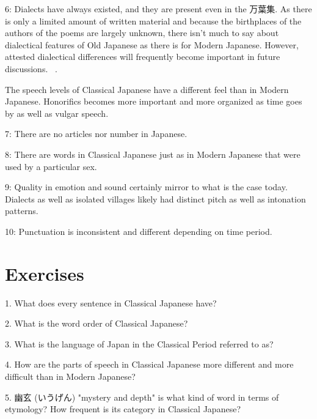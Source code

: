 \par{6: Dialects have always existed, and they are present even in the 万葉集. As there is only a limited amount of written material and because the birthplaces of the authors of the poems are largely unknown, there isn't much to say about dialectical features of Old Japanese as there is for Modern Japanese. However, attested dialectical differences will frequently become important in future discussions.  . }

\par{The speech levels of Classical Japanese have a different feel than in Modern Japanese. Honorifics becomes more important and more organized as time goes by as well as vulgar speech. }

\par{7: There are no articles nor number in Japanese. }

\par{8: There are words in Classical Japanese just as in Modern Japanese that were used by a particular sex. }

\par{9: Quality in emotion and sound certainly mirror to what is the case today. Dialects as well as isolated villages likely had distinct pitch as well as intonation patterns. }

\par{10: Punctuation is inconsistent and different depending on time period. }
      
\section{Exercises}
 
\par{1. What does every sentence in Classical Japanese have? }

\par{2. What is the word order of Classical Japanese? }

\par{3. What is the language of Japan in the Classical Period referred to as? }

\par{4. How are the parts of speech in Classical Japanese more different and more difficult than in Modern Japanese? }

\par{5.  幽玄 (いうげん) "mystery and depth" is what kind of word in terms of etymology? How frequent is its category in Classical Japanese? }

